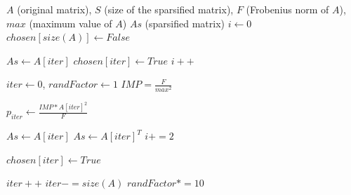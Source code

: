 \begin{algorithm}[H] 
  \footnotesize
  \caption{$As = Sparsify(A, S, F, max)$} \label{alg:spars004} 
  \begin{algorithmic}[1]
    \Require $A$ (original matrix), $S$ (size of the sparsified matrix), $F$ (Frobenius norm of $A$), $max$ (maximum value of $A$) 
    \Ensure  $As$ (sparsified matrix)
    \State $i \leftarrow 0$
    \State $chosen[size(A)] \leftarrow False$ 
    
	    \State $As \leftarrow A[iter]$
	    \State $chosen[iter] \leftarrow True$
	    \State $i++$
      \EndIf
	
    \EndFor
    \State $iter \leftarrow 0$, $randFactor \leftarrow 1$ 
    \State $IMP = \frac{F}{max^2}$
    
    
	\State $p_{iter} \leftarrow \frac{IMP * A[iter]^2}{F}$
	
	
	  \State $As \leftarrow A[iter]$
	  \State $As \leftarrow A[iter]^T$
	  \State $i += 2$

	    \State $chosen[iter] \leftarrow True$
	\EndIf
      
      \EndIf
      
      \State $iter++$
	\State $iter -= size(A)$
	\State $randFactor *= 10$
      \EndIf
      
    \EndWhile
  \end{algorithmic}
\end{algorithm}


